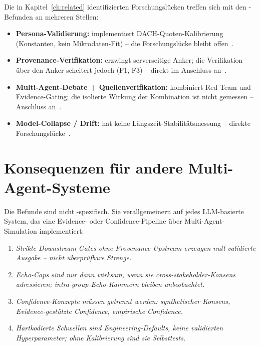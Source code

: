 Die in Kapitel~\ref{ch:related} identifizierten Forschungsl{\"u}cken treffen sich mit den \agora{}-Befunden an mehreren Stellen:

\begin{itemize}
  \item \textbf{Persona-Validierung:} \agora{} implementiert DACH-Quoten-Kalibrierung (Konstanten, kein Mikrodaten-Fit) -- die Forschungsl{\"u}cke bleibt offen~\cite{uas2025,analyticflexibility}.
  \item \textbf{Provenance-Verifikation:} \agora{} erzwingt serverseitige Anker; die Verifikation {\"u}ber den Anker scheitert jedoch (F1, F3) -- direkt im Anschluss an~\cite{citednotverified}.
  \item \textbf{Multi-Agent-Debate + Quellenverifikation:} \agora{} kombiniert Red-Team und Evidence-Gating; die isolierte Wirkung der Kombination ist nicht gemessen -- Anschluss an~\cite{mast2025,hiddenbench2025}.
  \item \textbf{Model-Collapse / Drift:} \agora{} hat keine L{\"a}ngszeit-Stabilit{\"a}tsmessung -- direkte Forschungsl{\"u}cke~\cite{shumailov2024curse}.
\end{itemize}

\section{Konsequenzen f{\"u}r andere Multi-Agent-Systeme}\label{sec:konsequenzen}

Die Befunde sind nicht \agora{}-spezifisch. Sie verallgemeinern auf jedes LLM-basierte System, das eine Evidence- oder Confidence-Pipeline {\"u}ber Multi-Agent-Simulation implementiert:

\begin{enumerate}
  \item \emph{Strikte Downstream-Gates ohne Provenance-Upstream erzeugen null validierte Ausgabe -- nicht {\"u}berpr{\"u}fbare Strenge.}
  \item \emph{Echo-Caps sind nur dann wirksam, wenn sie cross-stakeholder-Konsens adressieren; intra-group-Echo-Kammern bleiben unbeobachtet.}
  \item \emph{Confidence-Konzepte m{\"u}ssen getrennt werden: synthetischer Konsens, Evidence-gest{\"u}tzte Confidence, empirische Confidence.}
  \item \emph{Hartkodierte Schwellen sind Engineering-Defaults, keine validierten Hyperparameter; ohne Kalibrierung sind sie Selbsttests.}
\end{enumerate}

